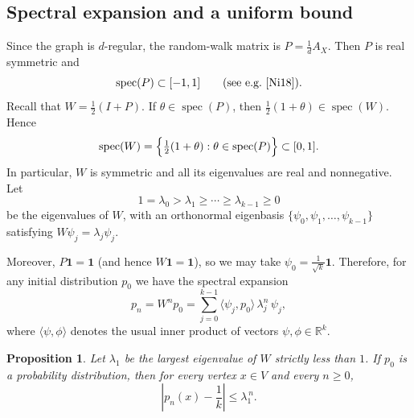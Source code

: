 \documentclass[11pt,reqno]{article}
\numberwithin{equation}{section}
\DeclareMathOperator{\spec}{spec}
\theoremstyle{plain}
\newtheorem{proposition}[theorem]{Proposition}
\theoremstyle{definition}
\theoremstyle{remark}
\begin{document}
\subsection{Spectral expansion and a uniform bound}

Since the graph is $d$-regular, the random-walk matrix is
$P=\frac{1}{d}A_X$.
 Then $P$ is real symmetric and
\[
\spec(P)\subset[-1,1]
\qquad\text{(see e.g.\ \cite[Thm.~7.5]{Ni18}).}
\]
Recall that $ W=\frac12(I+P)$.
If $\theta\in\spec(P)$, then $\frac12(1+\theta)\in\spec(W)$. Hence
\[
\spec(W)=\Bigl\{\tfrac12(1+\theta):\theta\in\spec(P)\Bigr\}\subset[0,1].
\]
In particular, $W$ is symmetric and all its eigenvalues are real and nonnegative.
Let
\begin{equation}
\label{lambdas}
1=\lambda_0>\lambda_1\ge \cdots \ge \lambda_{k-1}\ge 0
\end{equation}
be the eigenvalues of $W$, with an orthonormal eigenbasis
$\{\psi_0,\psi_1,\dots,\psi_{k-1}\}$ satisfying $W\psi_j=\lambda_j\psi_j$.

Moreover, $P\mathbf{1}=\mathbf{1}$ (and hence $W\mathbf{1}=\mathbf{1}$), so we may take $
\psi_0=\frac{1}{\sqrt{k}}\mathbf{1}.
$
Therefore, for any initial distribution $p_0$ we have the spectral expansion
\[
p_n=W^n p_0=\sum_{j=0}^{k-1}\langle \psi_j,p_0\rangle\,\lambda_j^n\,\psi_j,
\]
where $\langle \psi,\phi\rangle$ denotes the usual inner product of vectors $\psi,\phi \in\mathbb{R}^k$.

\begin{proposition}\label{prop:mixing}
Let $\lambda_1$ be the largest eigenvalue of $W$ strictly less than $1$.
If $p_0$ is a probability distribution, then for every vertex $x\in V$ and every $n\ge 0$,
\[
\left|p_n(x)-\frac{1}{k}\right|\le \lambda_1^{\,n}.
\]
\end{proposition}
\end{document}

